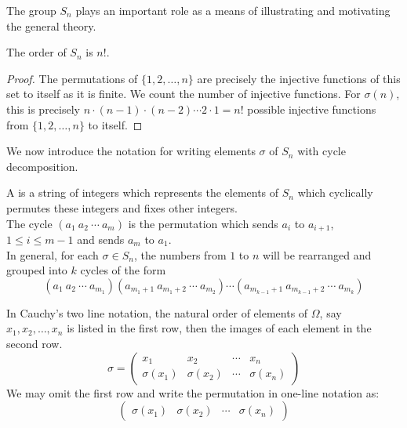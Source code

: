The group $S_n$ plays an important role as a means of illustrating and motivating the general theory.

\begin{theorem}
The order of $S_n$ is $n!$.
\end{theorem}
\begin{proof}
The permutations of $\{1,2,\ldots, n\}$ are precisely the injective functions of this set to itself as it is finite. We count the number of injective functions. For $\sigma(n)$, this is precisely $n \cdot (n-1) \cdot (n-2) \cdots 2 \cdot 1 = n!$ possible injective functions from $\{1,2,\ldots, n\}$ to itself.
\end{proof}

We now introduce the notation for writing elements $\sigma$ of $S_n$ with cycle decomposition.

\begin{definition}
A  is a string of integers which represents the elements of $S_n$ which cyclically permutes these integers and fixes other integers.\\
The cycle $(a_1 \ a_2 \ \cdots \ a_m)$ is the permutation which sends $a_i$ to $a_{i+1}$, $1 \leq i \leq m-1$ and sends $a_m$ to $a_1$.\\
In general, for each $\sigma \in S_n$, the numbers from $1$ to $n$ will be rearranged and grouped into $k$ cycles of the form
\begin{equation}
(a_1 \ a_2 \ \cdots \ a_{m_1})(a_{m_1 + 1} \ a_{m_1 +2} \ \cdots \ a_{m_2}) \cdots (a_{m_{k-1} + 1} \ a_{m_{k-1} + 2} \ \cdots \ a_{m_k}) \nonumber
\end{equation}
\end{definition}

\begin{remark}
In Cauchy's two line notation, the natural order of elements of $\Omega$, say $x_1, x_2, \ldots, x_n$ is listed in the first row, then the images of each element in the second row.
\begin{equation}
\sigma = 
\begin{pmatrix}
x_1 & x_2 & \cdots & x_n \\
\sigma(x_1) & \sigma(x_2) & \cdots & \sigma(x_n)
\end{pmatrix} \nonumber
\end{equation}
We may omit the first row and write the permutation in one-line notation as:
\begin{equation} 
\begin{pmatrix}
\sigma(x_1) & \sigma(x_2) & \cdots & \sigma(x_n)
\end{pmatrix} \nonumber
\end{equation}
\end{remark}

